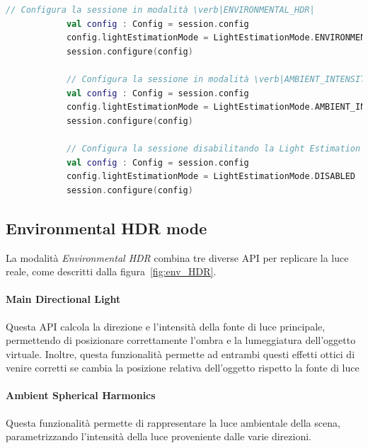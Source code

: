 \documentclass[crop=false, class=book]{standalone}
\begin{document}
	\begin{center}
		\begin{minipage}{0.95\textwidth}
			\begin{lstlisting}[caption={Configurazione della modalità di stima della luce.}, label={lst:le_session}, language=Kotlin]
			// Configura la sessione in modalità \verb|ENVIRONMENTAL_HDR|
			val config : Config = session.config
			config.lightEstimationMode = LightEstimationMode.ENVIRONMENTAL_HDR
			session.configure(config)
			
			// Configura la sessione in modalità \verb|AMBIENT_INTENSITY|
			val config : Config = session.config
			config.lightEstimationMode = LightEstimationMode.AMBIENT_INTENSITY
			session.configure(config)
				
			// Configura la sessione disabilitando la Light Estimation API
			val config : Config = session.config
			config.lightEstimationMode = LightEstimationMode.DISABLED
			session.configure(config)
			\end{lstlisting}
		\end{minipage}
	\end{center}


	

	\subsection*{Environmental HDR mode}
		La modalità \textit{Environmental HDR} combina tre diverse API per replicare la luce reale, come descritti dalla figura~\vref{fig:env_HDR}.
	
		\paragraph*{Main Directional Light}
			Questa API calcola la direzione e l'intensità della fonte di luce principale, permettendo di posizionare correttamente l'ombra e la lumeggiatura dell'oggetto virtuale. Inoltre, questa funzionalità permette ad entrambi questi effetti ottici di venire corretti se cambia la posizione relativa dell'oggetto rispetto la fonte di luce
		
		\paragraph*{Ambient Spherical Harmonics}
			Questa funzionalità permette di rappresentare la luce ambientale della scena, parametrizzando l'intensità della luce proveniente dalle varie direzioni.
		
\end{document}
